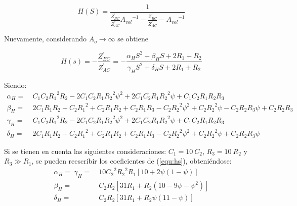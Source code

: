 \begin{equation*}
	H(S) = \frac{1}{\frac{Z_{BC}^{'}}{Z_{AC}^{'}} {A_{vol}}^{-1} - \frac{Z_{BC}^{'}}{Z_{AC}^{'}} - {A_{vol}}^{-1}}
	\label{equ:hsavol}
\end{equation*}

Nuevamente, considerando $A_o \rightarrow \infty$ se obtiene

\begin{equation}
	H(s) = -\frac{Z_{BC}^{'}}{Z_{AC}^{'}} = - \frac{\alpha_H S^{2} + \beta_H S + 2 R_{1} + R_{2}}
	{\gamma_H S^{2} + \delta_H S + 2 R_{1} + R_{2}}
	\label{equ:hs}
\end{equation}

Siendo: 
\begin{equation}
\begin{split}
	\alpha_H =\ & C_{1} C_{2} {R_{1}}^{2} R_{2} - 2 C_{1} C_{2} R_{1} {R_{2}}^{2} \psi^{2} + 2 C_{1} C_{2} R_{1} {R_{2}}^{2} \psi + C_{1} C_{2} R_{1} R_{2} R_{3}\\
	\beta_H =\ & 2 C_{1} R_{1} R_{2} + C_{2} {R_{1}}^{2} + C_{2} R_{1} R_{2} + C_{2} R_{1} R_{3} - C_{2} {R_{2}}^{2} \psi^{2} + C_{2} {R_{2}}^{2} \psi - C_{2} R_{2} R_{3} \psi + C_{2} R_{2} R_{3}\\
	\gamma_H =\ & C_{1} C_{2} {R_{1}}^{2} R_{2} - 2 C_{1} C_{2} R_{1} {R_{2}}^{2} \psi^{2} + 2 C_{1} C_{2} R_{1} {R_{2}}^{2} \psi + C_{1} C_{2} R_{1} R_{2} R_{3}\\
	\delta_H =\ & 2 C_{1} R_{1} R_{2} + C_{2} {R_{1}}^{2} + C_{2} R_{1} R_{2} + C_{2} R_{1} R_{3} - C_{2} {R_{2}}^{2} \psi^{2} + C_{2} {R_{2}}^{2} \psi + C_{2} R_{2} R_{3} \psi
\end{split}
\label{equ:general}
\end{equation}


Si se tienen en cuenta las siguientes consideraciones: $C_1 = 10 \ C_2$, $R_3 = 10 \ R_2$ y $R_3 \gg R_1$, se pueden reescribir los coeficientes de (\ref{equ:hs}), obteniéndose: 
\begin{equation}
\begin{split}
	\alpha_H =\ \gamma_H =\ & 10 {C_{2}}^{2} {R_{2}}^{2} R_{1} \left[ 10 + 2 \psi \left(1 - \psi \right) \right] \\
	\beta_H =\ & C_{2} R_{2} \left[ 31 R_1 + R_2 \left(10 - 9 \psi - \psi^2 \right) \right] \\
	\delta_H =\ & C_{2} R_{2} \left[ 31 R_1 + R_2 \psi \left(11 - \psi \right) \right] \\
\end{split}
\label{equ:simplifica}
\end{equation}

